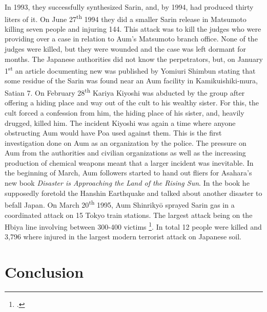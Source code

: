 \documentclass[12pt, letterpaper]{article}
\newcommand{\poses}[1]{#1's}
\begin{document}
In 1993, they successfully synthesized Sarin, and, by 1994, had
produced thirty liters of it. On June 27\textsuperscript{th} 1994 they did a smaller Sarin release in
Matsumoto killing seven people and injuring 144. This attack was to kill the judges who were providing over a
case in relation to \poses{Aum} Matsumoto branch office. None of the judges were killed, but they were 
wounded and the case was left dormant for months. The Japanese authorities did not know the perpetrators,
but, on January 1\textsuperscript{st} an article documenting new was published by Yomiuri Shimbun stating 
that some residue of the Sarin was found near an Aum facility in Kamikuishiki-mura, Satian 7. On February
28\textsuperscript{th} Kariya Kiyoshi was abducted by the group after offering a hiding place and way out of
the cult to his wealthy sister. For this, the cult forced a confession from him, the hiding place of his
sister, and, heavily drugged, killed him. The incident Kiyoshi was again a time where anyone obstructing Aum
would have Poa used against them. This is the first investigation done on Aum as an organization by
the police. The pressure on Aum from the authorities and civilian organizations as well as the increasing
production of chemical weapons meant that a larger incident was inevitable. In the beginning of March, Aum
followers started to hand out fliers for \poses{Asahara} new book \textit{Disaster is Approaching the Land 
  of the Rising Sun}. In the book he supposedly foretold the Hanshin Earthquake and talked about another
disaster to befall Japan. On March 20\textsuperscript{th} 1995, Aum Shinriky\=o sprayed Sarin gas in a
coordinated attack on 15 Tokyo train stations. The largest attack being on the Hbiya line involving between
300-400 victims \footcite[513]{olson_aum_1999}. In total 12 people were killed and 3,796 where injured in the
largest modern terrorist attack on Japanese soil.

\section{Conclusion}
\end{document}
